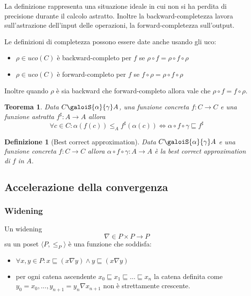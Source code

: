 \documentclass[a4paper, 11pt]{article}
\newtheorem{definit}{Definizione}[subsection]
\newtheorem{thm}{Teorema}[subsection]
\begin{document}
	La definizione rappresenta una situazione ideale in cui non si ha perdita di precisione durante il calcolo astratto. Inoltre la backward-completezza lavora sull'astrazione dell'input delle operazioni, la forward-completezza sull'output.
	
	Le definizioni di completezza possono essere date anche usando gli uco: \begin{itemize}
		\item $\rho \in uco(C)$ è backward-completo per $f$ se $\rho \circ f = \rho \circ f \circ \rho$
		\item $\rho \in uco(C)$ è forward-completo per $f$ se $f \circ \rho = \rho \circ f \circ \rho$
	\end{itemize}

	Inoltre quando $\rho$ è sia backward che forward-completo allora vale che $\rho \circ f = f \circ \rho$.
	
	\begin{thm}
		Data $C \galoiS{\alpha}{\gamma} A$, una funzione concreta $f : C \to C$  e una funzione astratta $f^\sharp: A \to A$ allora  \[ \forall c \in C: \alpha(f(c)) \leq_A f^\sharp(\alpha(c)) \Leftrightarrow \alpha \circ f \circ \gamma \sqsubseteq f^\sharp \]
	\end{thm}

	\begin{definit}[Best correct approximation]
		Data $C \galoiS{\alpha}{\gamma} A$ e una funzione concreta $f : C \to C$ allora $\alpha \circ f \circ \gamma : A \to A$ è la best correct approximation di $f$ in $A$.
	\end{definit}

	\subsection{Accelerazione della convergenza}
	\subsubsection{Widening}
	Un widening \[ \nabla \in P \times P \to P  \] su un poset $ \langle P, \leq_P \rangle $ è una funzione che soddisfa:
	\begin{itemize}
		\item $\forall x,y \in P : x \sqsubseteq (x \nabla y ) \wedge y \sqsubseteq (x \nabla y)$
		\item per ogni catena ascendente $x_0 \sqsubseteq x_1 \sqsubseteq ... \sqsubseteq x_n$ la catena definita come $y_0 = x_0, ..., y_{n+1} = y_n \nabla x_{n+1}$ non è strettamente crescente.
	\end{itemize}
	
\end{document}
